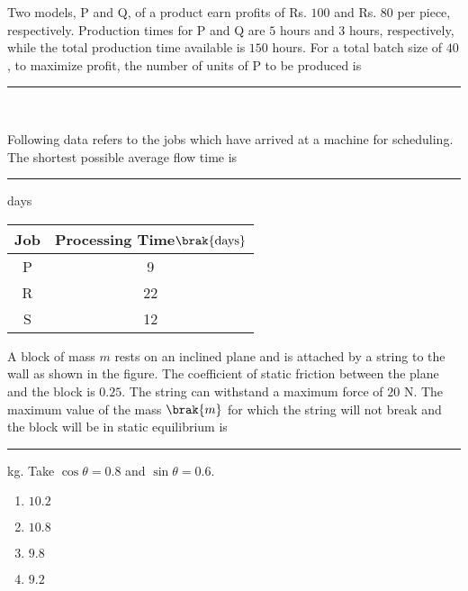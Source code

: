 \item{
Two models, P and Q, of a product earn profits of Rs. $100$ and Rs. $80$ per piece, respectively. Production times for P and Q are $5$ hours and $3$ hours, respectively, while the total production time available is $150$ hours. For a total batch size of $40$, to maximize profit, the number of units of P to be produced is \rule{2cm}{0.15mm}}\\
\item{
Following data refers to the jobs  which have arrived at a machine for scheduling. The shortest possible average flow time is \rule{2cm}{0.15mm} days
\begin{table}[H]
    \centering
    \begin{tabular}{|c|c|}
        \hline
         Job&Processing Time$\brak{\text{days}}$  \\
         \hline
         P&9\\
         \hline
         R&22\\
         \hline
         S&12\\
         \hline
    \end{tabular}
    \label{tab:my_label}
\end{table}
}
\item{
    A block of mass $m$ rests on an inclined plane and is attached by a string to the wall as shown in the figure. The coefficient of static friction between the plane and the block is $0.25$. The string can withstand a maximum force of $20$ N. The maximum value of the mass $\brak{m}$ for which the string will not break and the block will be in static equilibrium is \rule{3cm}{0.15mm}kg. Take $\cos\theta=0.8$ and $\sin\theta=0.6$.
\begin{figure}[H]
\centering
{}%

\label{fig:my_label}
\end{figure}
\begin{multicols}{4}
\begin{enumerate}
\item $10.2$
\item $10.8$
\item $9.8$
\item $9.2$
\end{enumerate}
\end{multicols}
}
